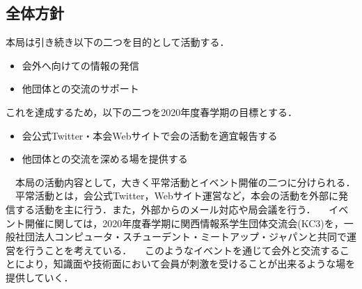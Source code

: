 \subsection*{全体方針}


本局は引き続き以下の二つを目的として活動する．
\begin{itemize}
    \item 会外へ向けての情報の発信
    \item 他団体との交流のサポート
\end{itemize}
これを達成するため，以下の二つを2020年度春学期の目標とする．
\begin{itemize}
    \item 会公式Twitter・本会Webサイトで会の活動を適宜報告する
    \item 他団体との交流を深める場を提供する
\end{itemize}
　本局の活動内容として，大きく平常活動とイベント開催の二つに分けられる．
　平常活動とは，会公式Twitter，Webサイト運営など，本会の活動を外部に発信する活動を主に行う．また，外部からのメール対応や局会議を行う．
　イベント開催に関しては，2020年度春学期に関西情報系学生団体交流会(KC3)を，一般社団法人コンピュータ・スチューデント・ミートアップ・ジャパンと共同で運営を行うことを考えている．
　このようなイベントを通じて会外と交流することにより，知識面や技術面において会員が刺激を受けることが出来るような場を提供していく．
